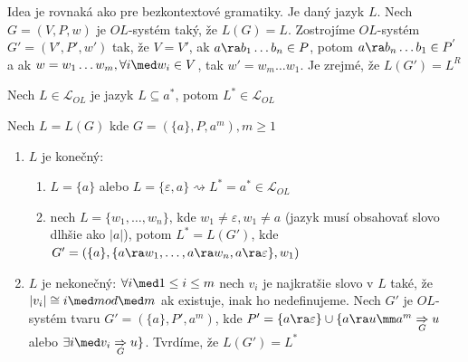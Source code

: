 \begin{dokaz}
Idea je rovnaká ako pre bezkontextové gramatiky. Je daný jazyk
$L$. Nech $G=(V,P,w)$ je $OL$-systém taký, že $L(G)=L$. Zostrojíme
$OL$-systém $G'=(V',P',w')$ tak, že $V=V'$, ak $a\ra b_{1}\dots
b_{n}\in P$, potom $a\ra b_{n}\dots b_{1}\in P^{'}$ a ak
$w=w_{1}\dots w_{m},\forall i\med w_i\in V$, tak $w'=w_{m}\dots
w_{1}$. Je zrejmé, že $L(G')=L^{R}$
\end{dokaz}

\begin{veta}
Nech $L\in\mathcal{L}_{OL}$ je jazyk $L\subseteq a^{*}$, potom
$L^{*}\in\mathcal{L}_{OL}$
\end{veta}

\begin{dokaz}
Nech $L=L(G)$ kde $G=(\{a\},P,a^{m}),m\geq1$

\begin{enumerate}
\item $L$ je konečný:
\begin{enumerate}
\item $L=\{a\}$ alebo $L=\{\varepsilon,a\}\rightsquigarrow
L^{*}=a^{*}\in\mathcal{L}_{OL}$
\item nech $L=\{w_{1},\dots,w_{n}\}$, kde
$w_{1}\neq\varepsilon,w_{1}\neq a$ (jazyk musí obsahovať slovo
dlhšie ako $|a|$), potom $L^{*}=L(G')$, kde $G'=(\{a\},\{a\ra
w_{1},\dots,a\ra w_{n},a\ra\varepsilon\},w_{1})$
\end{enumerate}

\item $L$ je nekonečný: $\forall i\med 1\leq i\leq m$ nech
$v_{i}$ je najkratšie slovo v $L$ také, že $|v_{i}|\cong i\med
mod\med m$ ak existuje, inak ho nedefinujeme. Nech $G'$ je
$OL$-systém tvaru $G'=(\{a\},P',a^{m})$, kde
$P'=\{a\ra\varepsilon\}\cup\{a\ra u\mm
a^{m}\underset{G}\Rightarrow u$ alebo $\exists i\med
v_{i}\underset{G}\Rightarrow u\}$. Tvrdíme, že $L(G')=L^{*}$


\end{enumerate}
\end{dokaz}
